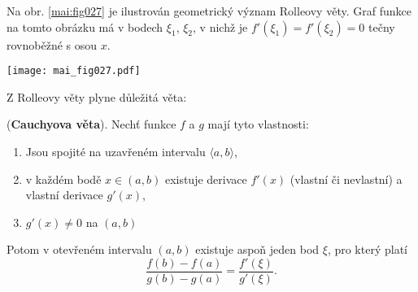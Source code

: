       \begin{tcnote}
        Na obr. \ref{mai:fig027} je ilustrován geometrický význam Rolleovy věty. Graf funkce na 
        tomto obrázku má v bodech $\xi_1$, $\xi_2$, v nichž je $f'(\xi_1)=f'(\xi_2)=0$ tečny 
        rovnoběžné s osou $x$. 
        {\centering
        \captionsetup{type=figure}
        \texttt{[image: mai\_fig027.pdf]}
        \par}
      \end{tcnote}
      
      Z Rolleovy věty plyne důležitá věta:
      
      \begin{lemma}\label{MA1:lem_diff04}
        (\textbf{Cauchyova věta}). Nechť funkce $f$ a $g$ mají tyto vlastnosti:
        \begin{enumerate}[noitemsep]
          \item  Jsou spojité na uzavřeném intervalu $\langle a,b\rangle$,
          \item  v každém bodě $x\in(a,b)$ existuje derivace $f'(x)$ (vlastní či nevlastní) a 
                 vlastní derivace $g'(x)$,
          \item  $g'(x)\neq0$ na $(a,b)$
        \end{enumerate}
        Potom v otevřeném intervalu $(a,b)$ existuje aspoň jeden bod $\xi$, pro který platí
        \begin{equation}\label{MA1:eq_diff03}
          \frac{f(b)-f(a)}{g(b)-g(a)} = \frac{f'(\xi)}{g'(\xi)}.
        \end{equation} 
      \end{lemma} 
      
